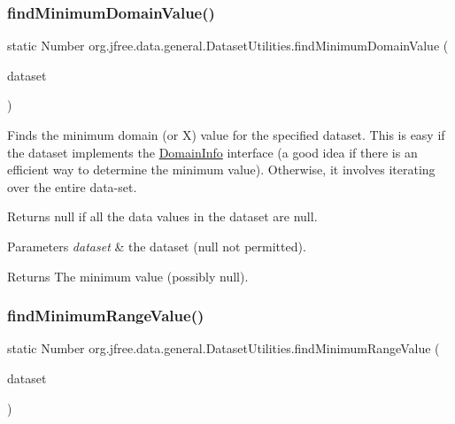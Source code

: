 \subsubsection{\texorpdfstring{find\+Minimum\+Domain\+Value()}{findMinimumDomainValue()}}
{\footnotesize\ttfamily static Number org.\+jfree.\+data.\+general.\+Dataset\+Utilities.\+find\+Minimum\+Domain\+Value (\begin{DoxyParamCaption}\item[{\mbox{\hyperlink{interfaceorg_1_1jfree_1_1data_1_1xy_1_1_x_y_dataset}{X\+Y\+Dataset}}}]{dataset }\end{DoxyParamCaption})\hspace{0.3cm}{\ttfamily [static]}}

Finds the minimum domain (or X) value for the specified dataset. This is easy if the dataset implements the \mbox{\hyperlink{interfaceorg_1_1jfree_1_1data_1_1_domain_info}{Domain\+Info}} interface (a good idea if there is an efficient way to determine the minimum value). Otherwise, it involves iterating over the entire data-\/set. 

Returns {\ttfamily null} if all the data values in the dataset are {\ttfamily null}.


\begin{DoxyParams}{Parameters}
{\em dataset} & the dataset ({\ttfamily null} not permitted).\\
\hline
\end{DoxyParams}
\begin{DoxyReturn}{Returns}
The minimum value (possibly {\ttfamily null}). 
\end{DoxyReturn}
\mbox{\label{classorg_1_1jfree_1_1data_1_1general_1_1_dataset_utilities_a1b56878458a91408258183f7561b52f2}} 
\subsubsection{\texorpdfstring{find\+Minimum\+Range\+Value()}{findMinimumRangeValue()}\hspace{0.1cm}{\footnotesize\ttfamily [1/2]}}
{\footnotesize\ttfamily static Number org.\+jfree.\+data.\+general.\+Dataset\+Utilities.\+find\+Minimum\+Range\+Value (\begin{DoxyParamCaption}\item[{\mbox{\hyperlink{interfaceorg_1_1jfree_1_1data_1_1category_1_1_category_dataset}{Category\+Dataset}}}]{dataset }\end{DoxyParamCaption})\hspace{0.3cm}{\ttfamily [static]}}

